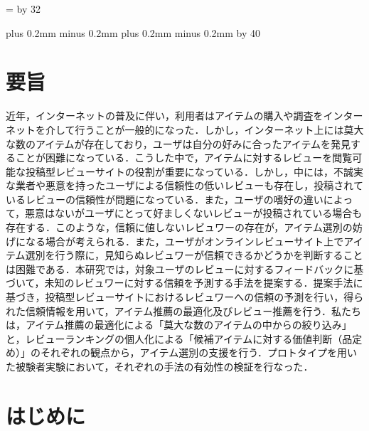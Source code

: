 \documentclass[a4paper,11pt,oneside,openany]{jsbook}
\def\linesparpage#1{\baselineskip=\textheight
   \divide\baselineskip by #1}
\def\kcharparline#1{
   \ifx\xkanjiskip\undefined
   \jintercharskip 0mm plus 0.2mm minus 0.2mm
   \else
   \xkanjiskip 0mm plus 0.2mm minus 0.2mm
   \fi
   \settowidth{\textwidth}{}
   \multiply\textwidth by #1
   }
\begin{document}
\linesparpage{32} 
\kcharparline{40}



\frontmatter

\chapter{要旨}
近年，インターネットの普及に伴い，利用者はアイテムの購入や調査をインターネットを介して行うことが一般的になった．しかし，インターネット上には莫大な数のアイテムが存在しており，ユーザは自分の好みに合ったアイテムを発見することが困難になっている．こうした中で，アイテムに対するレビューを閲覧可能な投稿型レビューサイトの役割が重要になっている．しかし，中には，不誠実な業者や悪意を持ったユーザによる信頼性の低いレビューも存在し，投稿されているレビューの信頼性が問題になっている．また，ユーザの嗜好の違いによって，悪意はないがユーザにとって好ましくないレビューが投稿されている場合も存在する．このような，信頼に値しないレビュワーの存在が，アイテム選別の妨げになる場合が考えられる．また，ユーザがオンラインレビューサイト上でアイテム選別を行う際に，見知らぬレビュワーが信頼できるかどうかを判断することは困難である．本研究では，対象ユーザのレビューに対するフィードバックに基づいて，未知のレビュワーに対する信頼を予測する手法を提案する．提案手法に基づき，投稿型レビューサイトにおけるレビュワーへの信頼の予測を行い，得られた信頼情報を用いて，アイテム推薦の最適化及びレビュー推薦を行う．私たちは，アイテム推薦の最適化による「莫大な数のアイテムの中からの絞り込み」と，レビューランキングの個人化による「候補アイテムに対する価値判断（品定め）」のそれぞれの観点から，アイテム選別の支援を行う．プロトタイプを用いた被験者実験において，それぞれの手法の有効性の検証を行なった．
\par


\tableofcontents

\mainmatter

\chapter{はじめに}
\end{document}
